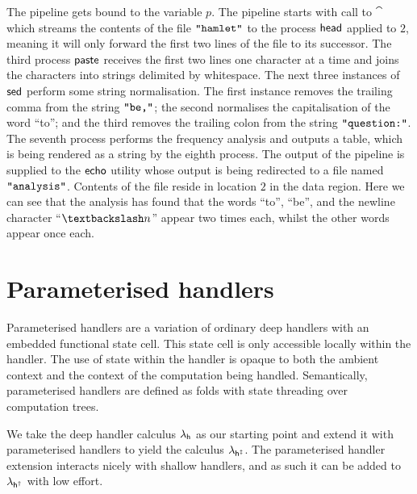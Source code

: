 \documentclass[12pt,phd,lfcs,twoside,openright,logo,leftchapter,normalheadings]{infthesis}
\theoremstyle{plain}
\theoremstyle{definition}
\begin{document}
%
The pipeline gets bound to the variable $p$. The pipeline starts with
call to $\cat$ which streams the contents of the file
$\texttt{"hamlet"}$ to the process $\mathsf{head}$ applied to $2$, meaning it
will only forward the first two lines of the file to its
successor. The third process $\mathsf{paste}$ receives the first two lines one
character at a time and joins the characters into strings delimited by
whitespace. The next three instances of $\mathsf{sed}$ perform some string
normalisation. The first instance removes the trailing comma from the
string $\texttt{"be,"}$; the second normalises the capitalisation of the
word ``to''; and the third removes the trailing colon from the string
$\texttt{"question:"}$. The seventh process performs the frequency
analysis and outputs a table, which is being rendered as a string by
the eighth process. The output of the pipeline is supplied to the
$\mathsf{echo}$ utility whose output is being redirected to a file named
$\texttt{"analysis"}$. Contents of the file reside in location $2$ in
the data region. Here we can see that the analysis has found that the
words ``to'', ``be'', and the newline character ``$\nl$'' appear two
times each, whilst the other words appear once each.

\section{Parameterised handlers}
\label{sec:unary-parameterised-handlers}

Parameterised handlers are a variation of ordinary deep handlers with
an embedded functional state cell. This state cell is only accessible
locally within the handler. The use of state within the handler is
opaque to both the ambient context and the context of the computation
being handled. Semantically, parameterised handlers are defined as
folds with state threading over computation trees.

We take the deep handler calculus $\lambda_{\mathsf{h}}$ as our starting point and
extend it with parameterised handlers to yield the calculus
$\lambda_{\mathsf{h^{\ddagger}}}$. The parameterised handler extension interacts nicely with
shallow handlers, and as such it can be added to $\lambda_{\mathsf{h^\dagger}}$ with low
effort.
\end{document}
